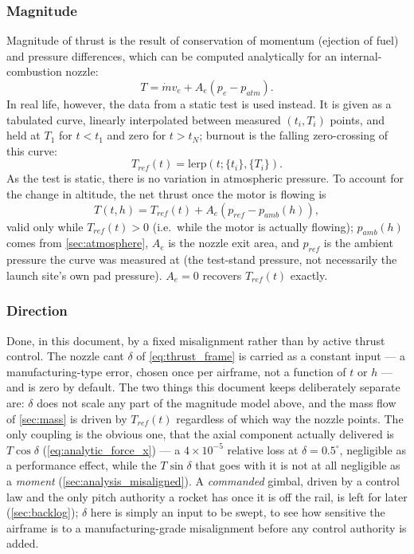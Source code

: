 \subsubsection{Magnitude}
Magnitude of thrust is the result of conservation of momentum (ejection of fuel) and pressure
differences, which can be computed analytically for an internal-combustion nozzle:
\begin{equation}
    T = \dot{m}v_e + A_e(p_e - p_{atm}).
\end{equation}
In real life, however, the data from a static test is used instead. It is given as a tabulated
curve, linearly interpolated between measured $(t_i,T_i)$ points, and held at $T_1$ for $t<t_1$
and zero for $t>t_N$; burnout is the falling zero-crossing of this curve:
\begin{equation}
    T_{ref}(t) = \mathrm{lerp}\!\left(t; \{t_i\}, \{T_i\}\right).
\end{equation}
As the test is static, there is no variation in atmospheric pressure. To account for the change in
altitude, the net thrust once the motor is flowing is
\begin{equation}
    T(t, h) = T_{ref}(t) + A_e\left(p_{ref} - p_{amb}(h)\right),
\end{equation}
valid only while $T_{ref}(t)>0$ (i.e.\ while the motor is actually flowing); $p_{amb}(h)$ comes
from \autoref{sec:atmosphere}, $A_e$ is the nozzle exit area, and $p_{ref}$ is the ambient pressure
the curve was measured at (the test-stand pressure, not necessarily the launch site's own pad
pressure). $A_e=0$ recovers $T_{ref}(t)$ exactly.

\subsubsection{Direction}
Done, in this document, by a fixed misalignment rather than by active thrust control. The nozzle
cant $\delta$ of \autoref{eq:thrust_frame} is carried as a constant input --- a manufacturing-type
error, chosen once per airframe, not a function of $t$ or $h$ --- and is zero by default. The two
things this document keeps deliberately separate are: $\delta$ does not scale any part of the
magnitude model above, and the mass flow of \autoref{sec:mass} is driven by $T_{ref}(t)$
regardless of which way the nozzle points. The only coupling is the obvious one, that the axial
component actually delivered is $T\cos\delta$ (\autoref{eq:analytic_force_x}) --- a $4\times10^{-5}$
relative loss at $\delta=0.5^\circ$, negligible as a performance effect, while the $T\sin\delta$
that goes with it is not at all negligible as a \emph{moment}
(\autoref{sec:analysis_misaligned}). A \emph{commanded} gimbal, driven by a control law and the
only pitch authority a rocket has once it is off the rail, is left for later
(\autoref{sec:backlog}); $\delta$ here is simply an input to be swept, to see how sensitive the
airframe is to a manufacturing-grade misalignment before any control authority is added.

